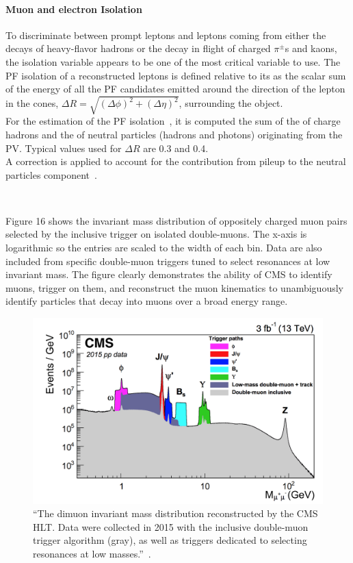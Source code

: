\paragraph{Muon and electron Isolation}\label{sec:muoniso}
To discriminate between prompt leptons and leptons coming from either the decays
of heavy-flavor hadrons or the decay in flight of charged $\pi^{\pm}$s and kaons, the isolation variable appears to be one of
the most critical variable to use. The PF isolation of a reconstructed
leptons is defined relative to its \pt as the scalar
sum of the energy of all the PF candidates emitted around the
direction of the lepton in the cones, $\Delta R = \sqrt{(\Delta
  \phi)^2+(\Delta \eta)^2}$, surrounding the object.\\
For the estimation of the PF isolation~\cite{CMS:particleflow}, it is computed the sum of the
\pt of charge hadrons and the \pt of neutral particles (hadrons
and photons) originating from the PV. Typical values used for  $\Delta
R$ are 0.3 and 0.4.\\
A correction is applied to account for the contribution from pileup to the
neutral particles component~\cite{Sirunyan_2018_muon}.



~\cite{CMS:particleflow}
~\cite{Collaboration_2014_tracking}
~\cite{Collaboration_2010_alligment}


Figure 16 shows the invariant mass distribution of oppositely charged muon pairs selected by
the inclusive trigger on isolated double-muons. The x-axis is logarithmic so the entries are
scaled to the width of each bin. Data are also included from specific double-muon triggers
tuned to select resonances at low invariant mass. The figure clearly demonstrates the ability of
CMS to identify muons, trigger on them, and reconstruct the muon kinematics to unambiguously
identify particles that decay into muons over a broad energy range.
 \begin{figure}[h]
\centering
\includegraphics[width=.88\textwidth]{Figures/c2/dimuon}
\caption{``The dimuon invariant mass distribution reconstructed by the CMS HLT. Data were
collected in 2015 with the inclusive double-muon trigger algorithm (gray), as well as triggers
dedicated to selecting resonances at low masses.''~\cite{Sirunyan_2018_muon}.}
\label{fig:dimuon}
\end{figure}






